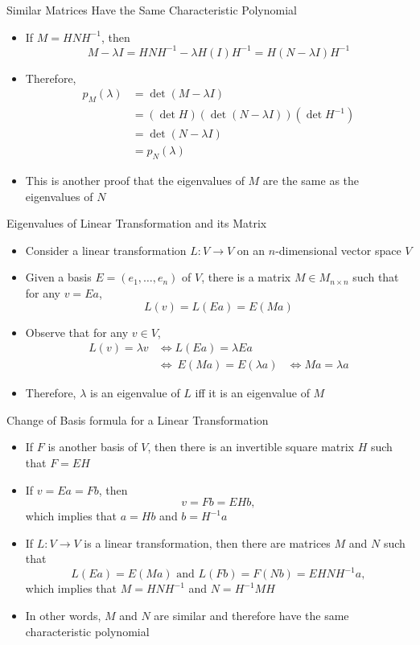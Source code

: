 \documentclass[usenames,dvipsnames,10pt]{beamer}
\begin{document}
\begin{frame}
  {Similar Matrices Have the Same Characteristic Polynomial}

  \begin{itemize}
  \item If $M = HNH^{-1}$, then
    \[
      M - \lambda I = HNH^{-1} - \lambda H(I)H^{-1} = H(N-\lambda I)H^{-1}
    \]
  \item Therefore,
    \begin{align*}
      p_M(\lambda) &= \det (M-\lambda I)\\
                   &= (\det H)(\det (N-\lambda I))(\det H^{-1})\\
                   &= \det (N-\lambda I)\\
                   &= p_N(\lambda)
    \end{align*}
  \item This is another proof that the eigenvalues of $M$ are the same as the eigenvalues of $N$
  \end{itemize}
\end{frame}

\begin{frame}
  {Eigenvalues of Linear Transformation and its Matrix}

  \begin{itemize}
  \item Consider a linear transformation $L: V \rightarrow V$ on an $n$-dimensional vector space $V$
  \item Given a basis $E = (e_1, \dots, e_n)$ of $V$, there is a matrix $M \in M_{n\times n}$ such that for any $v = Ea$,
    \[
      L(v) = L(Ea) = E(Ma)
    \]
  \item Observe that for any $v \in V$,
    \begin{align*}
      L(v) = \lambda v &\iff L(Ea) = \lambda Ea\\
                       &\iff\ E(Ma) = E(\lambda a)
                       &\iff Ma = \lambda a
    \end{align*}
  \item Therefore, $\lambda$ is an eigenvalue of $L$ iff it is an eigenvalue of $M$
  \end{itemize}
\end{frame}

\begin{frame}
  {Change of Basis formula for a Linear Transformation}
  \begin{itemize}
  \item If $F$ is another basis of $V$, then there is an invertible square matrix $H$ such that $F = EH$
  \item If $v = Ea = Fb$, then
    \[
      v = Fb = EHb,
    \]
    which implies that $a = Hb$ and $b = H^{-1}a$
  \item If $L: V \rightarrow V$ is a linear transformation, then there are matrices $M$ and $N$ such that
    \[
      L(Ea) = E(Ma)\text{ and }L(Fb) = F(Nb) = EHNH^{-1}a,
    \]
    which implies that $M = HNH^{-1}$ and $N = H^{-1}MH$
  \item In other words, $M$ and $N$ are similar and therefore have the same characteristic polynomial
  \end{itemize}
\end{frame}
\end{document}
